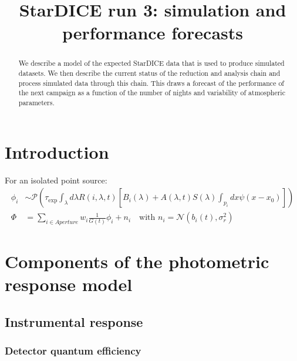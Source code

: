 \documentclass[\docopts]{\docclass}
\begin{document}
\title{ StarDICE run 3: simulation and performance forecasts }

\maketitlepre

\begin{abstract}
  We describe a model of the expected StarDICE data that is used to
  produce simulated datasets. We then describe the current status of
  the reduction and analysis chain and process simulated data through
  this chain. This draws a forecast of the performance of the next
  campaign as a function of the number of nights and variability of
  atmospheric parameters.
\end{abstract}


\maketitlepost

% 

\section{Introduction}
\label{sec:intro}

For an isolated point source:
\begin{equation}
  \begin{split}
    \phi_i & \sim \mathcal{P}\left(\tau_\text{exp} \int_{\lambda} d\lambda R(i, \lambda, t) \left[B_i(\lambda) + A(\lambda, t) S(\lambda)\int_{p_i} dx \psi(x - x_0)\right] \right)\\
    \Phi & = \sum_{i \in {Aperture}} w_i \frac1{G(t)} \phi_i + n_i  \quad \text{with } n_i = \mathcal{N}(b_i(t), \sigma_r^2) 
\end{split}
\end{equation}


\section{Components of the photometric response model}
\label{sec:model}

\subsection{Instrumental response}
\label{sec:instrument}

\subsubsection{Detector quantum efficiency }
\label{sec:qe}
\end{document}
